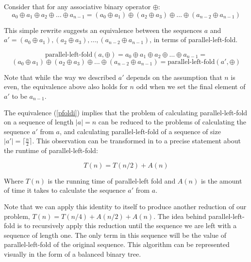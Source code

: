 \documentclass[12pt,twoside]{reedthesis}
\begin{document}
Consider that for any associative binary operator $\oplus$:
\begin{equation}
a_0 \oplus a_1 \oplus a_2 \oplus \ldots \oplus a_{n-1} = (a_0 \oplus a_1) \oplus (a_2 \oplus a_3) \oplus \ldots \oplus (a_{n-2} \oplus a_{n-1}) \label{assocident}
\end{equation}

This simple rewrite suggests an equivalence between the sequences $a$ and $a' = (a_0 \oplus a_1), (a_2 \oplus a_3), \ldots, (a_{n-2} \oplus a_{n-1})$, in terms of parallel-left-fold.

$$
\mbox{parallel-left-fold}(a, \oplus) = 
a_0 \oplus a_1 \oplus a_2 \oplus \ldots \oplus a_{n-1} =
$$
\begin{equation}
(a_0 \oplus a_1) \oplus (a_2 \oplus a_3) \oplus \ldots \oplus (a_{n-2} \oplus a_{n-1}) = 
\mbox{parallel-left-fold}(a', \oplus)
\label{pfoldi}
\end{equation}

Note that while the way we described $a'$ depends on the assumption that $n$ is even, the equivalence above also holds for $n$ odd when we set the final element of $a'$ to be $a_{n-1}$.
\vspace{1pc}

The equivalence (\ref{pfoldi}) implies that the problem of calculating parallel-left-fold on a sequence of length $|a| = n$ can be reduced to the problems of calculating the sequence $a'$ from $a$, and calculating parallel-left-fold of a sequence of size $|a'| = \lceil \frac{n}{2} \rceil$. This observation can be transformed in to a precise statement about the runtime of parallel-left-fold:

\begin{equation}
T(n) = T(n/2) + A(n) 
\label{rr}
\end{equation}

Where $T(n)$ is the running time of parallel-left fold and $A(n)$ is
the amount of time it takes to calculate the sequence $a'$ from $a$. 

Note that we can apply this identity to itself to produce another
reduction of our problem, $T(n) = T(n/4) + A(n/2) + A(n)$. The idea
behind parallel-left-fold is to recursively apply this reduction until
the sequence we are left with a sequence of length one. The only term
in this sequence will be the value of parallel-left-fold of the
original sequence. This algorithm can be represented visually in the
form of a balanced binary tree.
\end{document}
